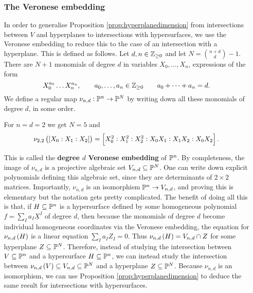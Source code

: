 \pagebreak

\subsubsection{The Veronese embedding}


In order to generalise Proposition \ref{prop:hyperplanedimension} from intersections between $ V $ and hyperplanes to intersections with hypersurfaces, we use the Veronese embedding to reduce this to the case of an intersection with a hyperplane. This is defined as follows. Let $ d, n \in \mathbb{Z}_{\ge 0} $ and let $ N = \binom{n + d}{d} - 1 $. There are $ N + 1 $ monomials of degree $ d $ in variables $ X_0, \dots, X_n $, expressions of the form
$$ X_0^{a_0} \dots X_n^{a_n}, \qquad a_0, \dots, a_n \in \mathbb{Z}_{\ge 0} \qquad a_0 + \dots + a_n = d. $$
We define a regular map $ \nu_{n, d} : \mathbb{P}^n \to \mathbb{P}^N $ by writing down all these monomials of degree $ d $, in some order.

\begin{example*}
For $ n = d = 2 $ we get $ N = 5 $ and
$$ \nu_{2, 2}\br{\sbr{X_0 : X_1 : X_2}} = \sbr{X_0^2 : X_1^2 : X_2^2 : X_0X_1 : X_1X_2 : X_0X_2}. $$
\end{example*}

This is called the \textbf{degree $ d $ Veronese embedding} of $ \mathbb{P}^n $. By completeness, the image of $ \nu_{n, d} $ is a projective algebraic set $ V_{n, d} \subseteq \mathbb{P}^N $. One can write down explicit polynomials defining this algebraic set, since they are determinants of $ 2 \times 2 $ matrices. Importantly, $ \nu_{n, d} $ is an isomorphism $ \mathbb{P}^n \to V_{n, d} $, and proving this is elementary but the notation gets pretty complicated. The benefit of doing all this is that, if $ H \subseteq \mathbb{P}^n $ is a hypersurface defined by some homogeneous polynomial $ f = \sum_I a_I\underline{X}^I $ of degree $ d $, then because the monomials of degree $ d $ become individual homogeneous coordinates via the Veronese embedding, the equation for $ \nu_{n, d}\br{H} $ is a linear equation $ \sum_I a_IZ_I = 0 $. Thus $ \nu_{n, d}\br{H} = V_{n, d} \cap Z $ for some hyperplane $ Z \subseteq \mathbb{P}^N $. Therefore, instead of studying the intersection between $ V \subseteq \mathbb{P}^n $ and a hypersurface $ H \subseteq \mathbb{P}^n $, we can instead study the intersection between $ \nu_{n, d}\br{V} \subseteq V_{n, d} \subseteq \PP^N $ and a hyperplane $ Z \subseteq \mathbb{P}^N $. Because $ \nu_{n, d} $ is an isomorphism, we can use Proposition \ref{prop:hyperplanedimension} to deduce the same result for intersections with hypersurfaces.


